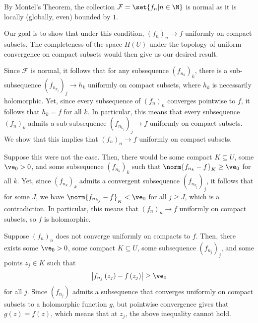 \documentclass[10pt]{mypackage}
\begin{document}
\begin{solution}
  By Montel's Theorem, the collection $\mathcal{F} = \set{f_n | n\in\N}$ is normal as it is locally (globally, even) bounded by $1$.%

  Our goal is to show that under this condition, $\left( f_n \right)_n\rightarrow f$ uniformly on compact subsets. The completeness of the space $H\left( U \right)$ under the topology of uniform convergence on compact subsets would then give us our desired result.%

  Since $\mathcal{F}$ is normal, it follows that for any subsequence $\left( f_{n_k} \right)_k$, there is a sub-subsequence $\left( f_{n_{k_{j}}} \right)_j\rightarrow h_k$ uniformly on compact subsets, where $h_k$ is necessarily holomorphic. Yet, since every subsequence of $\left( f_n \right)_n$ converges pointwise to $f$, it follows that $h_k = f$ for all $k$. In particular, this means that every subsequence $\left( f_n \right)_k$ admits a sub-subsequence $\left( f_{n_{k_j}} \right)_j\rightarrow f$ uniformly on compact subsets. We show that this implies that $\left( f_n \right)_n\rightarrow f$ uniformly on compact subsets.%

  Suppose this were not the case. Then, there would be some compact $K\subseteq U$, some $\ve_0 > 0$, and some subsequence $\left( f_{n_k} \right)_k$ such that $\norm{f_{n_k} - f}_{K}\geq \ve_0$ for all $k$. Yet, since $\left( f_{n_k} \right)_k$ admits a convergent subsequence $\left( f_{n_{k_j}} \right)_j$, it follows that for some $J$, we have $\norm{f_{n_{k_j}} - f}_{K} < \ve_0$ for all $j\geq J$, which is a contradiction. In particular, this means that $\left( f_n \right)_n\rightarrow f$ uniformly on compact subsets, so $f$ is holomorphic.
\end{solution}
\begin{solution}
  Suppose $\left( f_n \right)_n$ does not converge uniformly on compacts to $f$. Then, there exists some $\ve_0 > 0$, some compact $K\subseteq U$, some subsequence $\left( f_{n_j} \right)_j$, and some points $z_j\in K$ such that
  \begin{align*}
    \left\vert f_{n_j}\left(z_j\right) - f\left( z_j \right) \right\vert \geq \ve_0
  \end{align*}
  for all $j$. Since $\left( f_{n_j} \right)$ admits a subsequence that converges uniformly on compact subsets to a holomorphic function $g$, but pointwise convergence gives that $g(z) = f(z)$, which means that at $z_j$, the above inequality cannot hold.
\end{solution}
\end{document}
